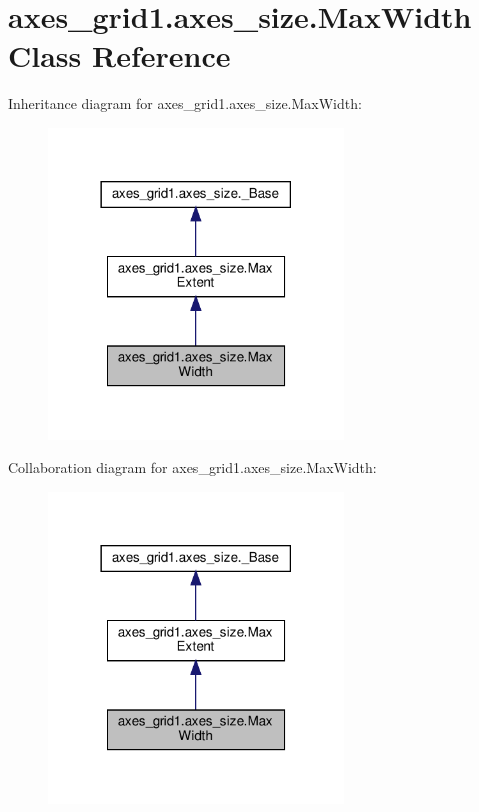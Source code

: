 \hypertarget{classaxes__grid1_1_1axes__size_1_1MaxWidth}{}\section{axes\+\_\+grid1.\+axes\+\_\+size.\+Max\+Width Class Reference}
\label{classaxes__grid1_1_1axes__size_1_1MaxWidth}


Inheritance diagram for axes\+\_\+grid1.\+axes\+\_\+size.\+Max\+Width\+:
\nopagebreak
\begin{figure}[H]
\begin{center}
\leavevmode
\includegraphics[width=222pt]{classaxes__grid1_1_1axes__size_1_1MaxWidth__inherit__graph}
\end{center}
\end{figure}


Collaboration diagram for axes\+\_\+grid1.\+axes\+\_\+size.\+Max\+Width\+:
\nopagebreak
\begin{figure}[H]
\begin{center}
\leavevmode
\includegraphics[width=222pt]{classaxes__grid1_1_1axes__size_1_1MaxWidth__coll__graph}
\end{center}
\end{figure}
